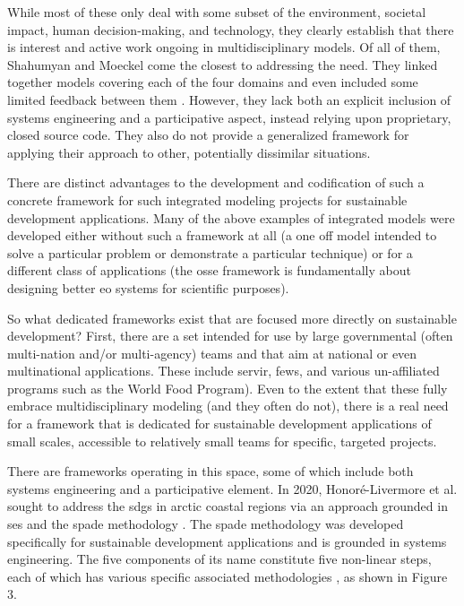 While most of these only deal with some subset of the environment, societal impact, human decision-making, and technology, they clearly establish that there is interest and active work ongoing in multidisciplinary models. Of all of them, Shahumyan and Moeckel come the closest to addressing the need. They linked together models covering each of the four domains and even included some limited feedback between them \cite{shahumyanIntegrationLandUse2017}. However, they lack both an explicit inclusion of systems engineering and a participative aspect, instead relying upon proprietary, closed source code. They also do not provide a generalized framework for applying their approach to other, potentially dissimilar situations.

There are distinct advantages to the development and codification of such a concrete framework for such integrated modeling projects for sustainable development applications. Many of the above examples of integrated models were developed either without such a framework at all (a one off model intended to solve a particular problem or demonstrate a particular technique) or for a different class of applications (the \ac{osse} framework is fundamentally about designing better \ac{eo} systems for scientific purposes). 

So what dedicated frameworks exist that are focused more directly on sustainable development? First, there are a set intended for use by large governmental (often multi-nation and/or multi-agency) teams and that aim at national or even multinational applications. These include \ac{servir}, \ac{fews}, and various \ac{un}-affiliated programs such as the World Food Program). Even to the extent that these fully embrace multidisciplinary modeling (and they often do not), there is a real need for a framework that is dedicated for sustainable development applications of small scales, accessible to relatively small teams for specific, targeted projects.

There are frameworks operating in this space, some of which include both systems engineering and a participative element. In 2020, Honoré-Livermore et al. sought to address the \acp{sdg} in arctic coastal regions via an approach grounded in \ac{ses} and the \ac{spade} methodology \cite{honore-livermoreAddressingSustainableDevelopment2020}. The \ac{spade} methodology was developed specifically for sustainable development applications and is grounded in systems engineering. The five components of its name constitute five non-linear steps, each of which has various specific associated methodologies \cite{haskinsSystemsEngineeringAnalyzed2008}, as shown in Figure 3.

